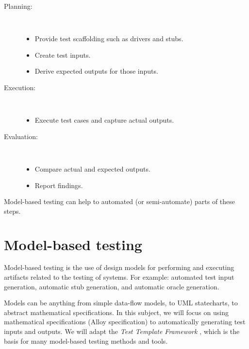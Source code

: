 \begin{description}
 \item[Planning:]~

  \begin{itemize}
 
    \item Provide test scaffolding such as drivers and stubs.

    \item Create test inputs.

    \item Derive expected outputs for those inputs.

  \end{itemize}


 \item[Execution:]~

  \begin{itemize}
 
    \item Execute test cases and capture actual outputs.
    
  \end{itemize}

\item[Evaluation:]~

  \begin{itemize}
 
    \item Compare actual and expected outputs.
  
   \item Report findings.

\end{itemize}
\end{description}

Model-based testing can help to automated (or semi-automate) parts of these steps.

\section{Model-based testing}


\begin{definition}
Model-based testing is the use of design models for performing and executing artifacts related to the testing of systems. For example: automated test input generation, automatic stub generation, and automatic oracle generation.
\end{definition}

Models can be anything from simple data-flow models, to UML statecharts, to abstract mathematical specifications. In this subject, we will focus on using mathematical specifications (Alloy specification) to automatically generating test inputs and outputs. We will adapt the {\em Test Template Framework} \cite{stocks96}, which is the basis for many model-based testing methods and tools.

